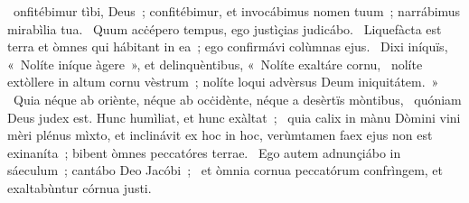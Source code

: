 { }
{%
~onfitébimur tìbi, Deus~; confitébimur, et invocábimus nomen tuum~; narrábimus mirabìlia tua. 
~Quum acċépero tempus, ego justìçias judicábo. 
~Liquefàcta est terra et òmnes qui hábitant in ea~; ego confirmávi colùmnas ejus. 
~Dixi iníquïs, «~Nolíte iníque àgere~», et delinquèntibus, «~Nolíte exaltáre cornu, 
~nolíte extòllere in altum cornu vèstrum~; nolíte loqui advèrsus Deum iniquitátem.~»
~Quia néque ab oriènte, néque ab ocċidènte, néque a desèrtïs mòntibus, 
~quóniam Deus judex est. Hunc humìliat, et hunc exàltat~; 
~quia calix in mànu Dòmini vini mèri plénus mìxto, et inclinávit ex hoc in hoc, verùmtamen faex ejus non est exinaníta~; bibent òmnes peccatóres terrae. 
~Ego autem adnunçiábo in sáeculum~; cantábo Deo Jacóbi~; 
~et òmnia cornua peccatórum confrìngem, et exaltabùntur córnua justi. 
}
